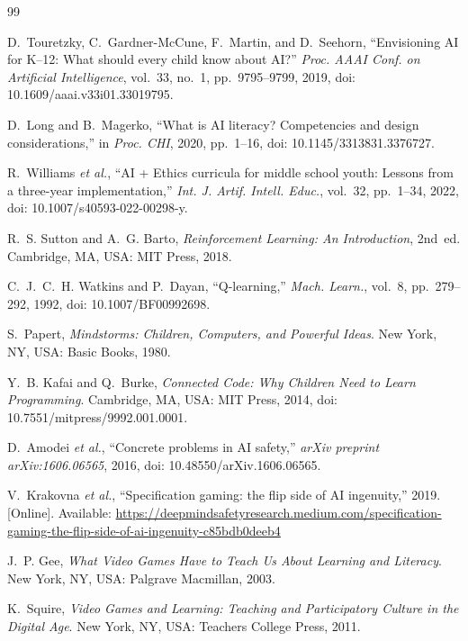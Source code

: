 \documentclass[conference]{IEEEtran}
\begin{document}
\begin{thebibliography}{99}

D.~Touretzky, C.~Gardner-McCune, F.~Martin, and D.~Seehorn,
``Envisioning AI for K--12: What should every child know about AI?''
\emph{Proc. AAAI Conf. on Artificial Intelligence}, vol.~33, no.~1, pp.~9795--9799, 2019, doi: 10.1609/aaai.v33i01.33019795.

D.~Long and B.~Magerko,
``What is AI literacy? Competencies and design considerations,''
in \emph{Proc. CHI}, 2020, pp.~1--16, doi: 10.1145/3313831.3376727.

R.~Williams \emph{et al.},
``AI + Ethics curricula for middle school youth: Lessons from a three-year implementation,''
\emph{Int. J. Artif. Intell. Educ.}, vol.~32, pp.~1--34, 2022, doi: 10.1007/s40593-022-00298-y.

R.~S. Sutton and A.~G. Barto,
\emph{Reinforcement Learning: An Introduction}, 2nd~ed.
Cambridge, MA, USA: MIT Press, 2018.

C.~J.~C.~H. Watkins and P.~Dayan,
``Q-learning,''
\emph{Mach. Learn.}, vol.~8, pp.~279--292, 1992, doi: 10.1007/BF00992698.

S.~Papert,
\emph{Mindstorms: Children, Computers, and Powerful Ideas}.
New York, NY, USA: Basic Books, 1980.

Y.~B. Kafai and Q.~Burke,
\emph{Connected Code: Why Children Need to Learn Programming}.
Cambridge, MA, USA: MIT Press, 2014, doi: 10.7551/mitpress/9992.001.0001.

D.~Amodei \emph{et al.},
``Concrete problems in AI safety,''
\emph{arXiv preprint arXiv:1606.06565}, 2016, doi: 10.48550/arXiv.1606.06565.

V.~Krakovna \emph{et al.},
``Specification gaming: the flip side of AI ingenuity,'' 2019.
[Online]. Available: \url{https://deepmindsafetyresearch.medium.com/specification-gaming-the-flip-side-of-ai-ingenuity-c85bdb0deeb4}

J.~P. Gee,
\emph{What Video Games Have to Teach Us About Learning and Literacy}.
New York, NY, USA: Palgrave Macmillan, 2003.

K.~Squire,
\emph{Video Games and Learning: Teaching and Participatory Culture in the Digital Age}.
New York, NY, USA: Teachers College Press, 2011.


\end{thebibliography}
\end{document}
